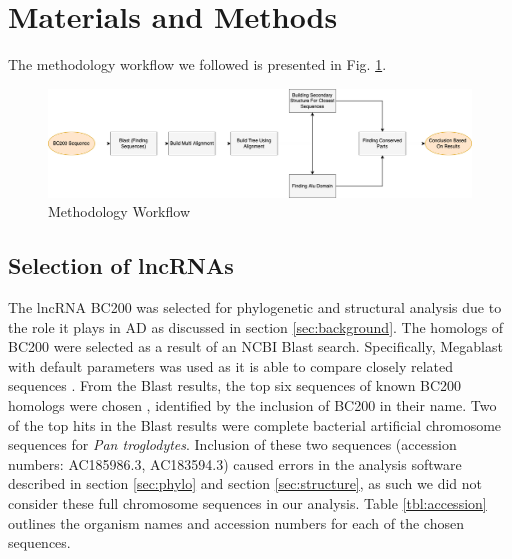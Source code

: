 \documentclass[conference, 11pt]{IEEEtran}
\begin{document}
\section{Materials and Methods}\label{sec:methods}

The methodology workflow we followed is presented in Fig. \ref{fig:methods}.

\begin{figure}[ht]
  \centering
  \includegraphics[width=\textwidth, keepaspectratio]{figs/workflow.png}
  \caption{Methodology Workflow}
  \label{fig:methods}
\end{figure}

\subsection{Selection of lncRNAs}\label{sec:lncRNA-selection}

The lncRNA BC200 was selected for phylogenetic and structural analysis due to the role it plays in AD as discussed in section \ref{sec:background}. 
The homologs of BC200 were selected as a result of an NCBI Blast \cite{blastTool} search. 
Specifically, Megablast \cite{morgulis2008database} with default parameters was used as it is able to compare closely related sequences \cite{amirmahani2018phylogenetic}. 
From the Blast results, the top six sequences of known BC200 homologs were chosen , identified by the inclusion of BC200 in their name. 
Two of the top hits in the Blast results were complete bacterial artificial chromosome sequences for \emph{Pan troglodytes}. 
Inclusion of these two sequences (accession numbers: AC185986.3, AC183594.3) caused errors in the analysis software described in section \ref{sec:phylo} and section \ref{sec:structure}, as such we did not consider these full chromosome sequences in our analysis. 
Table \ref{tbl:accession} outlines the organism names and accession numbers for each of the chosen sequences. 
\end{document}
